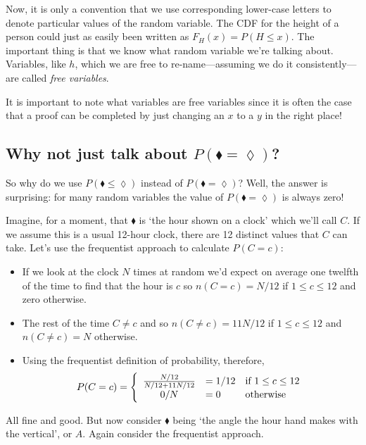 \documentclass[a4paper]{article}
\begin{document}
Now, it is only a convention that we use corresponding lower-case letters to
denote particular values of the random variable. The CDF for the height of a
person could just as easily been written as $F_H(x) = P(H \le x)$. The
important thing is that we know what random variable we're talking about.
Variables, like $h$, which we are free to re-name---assuming we do it
consistently---are called \emph{free variables}.

It is important to note what variables are free variables since it is often the
case that a proof can be completed by just changing an $x$ to a $y$ in the
right place!

\subsection{Why not just talk about $P(\blacklozenge = \lozenge)$?}

So why do we use $P(\blacklozenge \le \lozenge)$ instead of $P(\blacklozenge =
\lozenge)$? Well, the answer is surprising: for many random variables the value of
$P(\blacklozenge = \lozenge)$ is always zero!

Imagine, for a moment, that $\blacklozenge$ is `the hour shown on a clock'
which we'll call $C$. If we assume this is a usual 12-hour clock, there are 12
distinct values that $C$ can take. Let's use the frequentist approach to
calculate $P(C = c)$:

\begin{itemize}

\item If we look at the clock $N$ times at random we'd expect on average one
twelfth of the time to find that the hour is $c$ so $n(C = c) = N/12$ if $1 \le
c \le 12$ and zero otherwise.

\item The rest of the time $C \ne c$ and so $n(C \ne c) = 11N / 12$ if $1 \le c
\le 12$ and $n(C \ne c) = N$ otherwise.

\item Using the frequentist definition of probability, therefore,
\[
P(C = c) = \left\{
\begin{array}{c l l}
\frac{N/12}{N/12 + 11N/12} & = 1/12 & \mbox{if } 1 \le c \le 12 \\
0 / N & = 0 & \mbox{otherwise}
\end{array}
\right.
\]

\end{itemize}

All fine and good. But now consider $\blacklozenge$ being `the angle the hour
hand makes with the vertical', or $A$. Again consider the frequentist approach.
\end{document}
